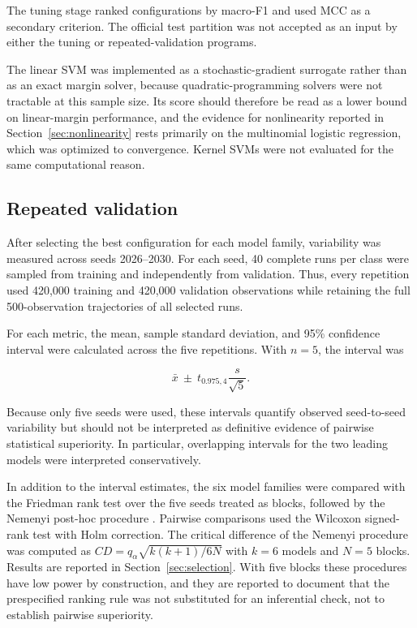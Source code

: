 \documentclass[12pt,a4paper]{article}
\begin{document}
The tuning stage ranked configurations by macro-F1 and used MCC as a secondary
criterion. The official test partition was not accepted as an input by either
the tuning or repeated-validation programs.

The linear SVM was implemented as a stochastic-gradient surrogate rather than
as an exact margin solver, because quadratic-programming solvers were not
tractable at this sample size. Its score should therefore be read as a lower
bound on linear-margin performance, and the evidence for nonlinearity reported
in Section~\ref{sec:nonlinearity} rests primarily on the multinomial logistic
regression, which was optimized to convergence. Kernel SVMs were not evaluated
for the same computational reason.

\subsection{Repeated validation}

After selecting the best configuration for each model family, variability was
measured across seeds 2026--2030. For each seed, 40 complete runs per class were
sampled from training and independently from validation. Thus, every repetition
used 420,000 training and 420,000 validation observations while retaining the
full 500-observation trajectories of all selected runs.

For each metric, the mean, sample standard deviation, and 95\% confidence
interval were calculated across the five repetitions. With $n=5$, the interval
was

\begin{equation}
\bar{x}\ \pm\ t_{0.975,4}\frac{s}{\sqrt{5}}.
\end{equation}

Because only five seeds were used, these intervals quantify observed
seed-to-seed variability but should not be interpreted as definitive evidence
of pairwise statistical superiority. In particular, overlapping intervals for
the two leading models were interpreted conservatively.

In addition to the interval estimates, the six model families were compared
with the Friedman rank test over the five seeds treated as blocks, followed by
the Nemenyi post-hoc procedure \cite{demsar2006statistical}. Pairwise
comparisons used the Wilcoxon signed-rank test with Holm correction. The
critical difference of the Nemenyi procedure was computed as
$\mathit{CD}=q_{\alpha}\sqrt{k(k+1)/6N}$ with $k=6$ models and $N=5$ blocks.
Results are reported in Section~\ref{sec:selection}. With five blocks these
procedures have low power by construction, and they are reported to document
that the prespecified ranking rule was not substituted for an inferential
check, not to establish pairwise superiority.
\end{document}
